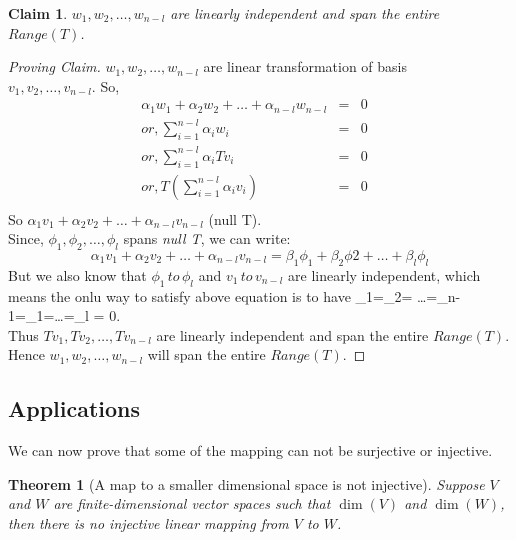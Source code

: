 \documentclass[a4paper,12pt,reqno,oneside]{amsart}
\newtheorem{theorem}{Theorem}
\theoremstyle{plain}
\newtheorem{claim}{Claim}
\numberwithin{equation}{section}
\begin{document}
	\begin{claim}
		$w_1, w_2, \ldots, w_{n-l}$ are linearly independent and span the entire $Range(T)$.
	\end{claim}
	\begin{proof}[Proving Claim]
	$w_1, w_2, \ldots, w_{n-l}$ are linear transformation of basis \\ $v_1, v_2, \ldots, v_{n-l}$.
	So,
	\begin{eqnarray*}
		\alpha_1  w_1 + \alpha_2 w_2 + \ldots + \alpha_{n-l} w_{n-l} & = & 0 & \\
		or, \sum_{i=1}^{n-l}{\alpha_i w_i} & = & 0 &\\
		or, \sum_{i=1}^{n-l}{\alpha_i Tv_i} & = & 0 &\\
		or, T(\sum_{i=1}^{n-l}{\alpha_i v_i}) & = & 0 &\\
	\end{eqnarray*} 
	So $ \alpha_1  v_1 + \alpha_2 v_2 + \ldots + \alpha_{n-l} v_{n-l} $ \in \dim(null T).\\
	Since, $\phi_1,\phi_2,\ldots,\phi_l$ spans \emph{null T}, we can write:
	$$
		\alpha_1  v_1 + \alpha_2 v_2 + \ldots + \alpha_{n-l} v_{n-l} = \beta_1 \phi_1 + \beta_2 \phi2 + \ldots + \beta_l \phi_l
	$$
	But we also know that $\phi_1 \, to \, \phi_l$ and $v_1 \, to \, v_{n-l}$ are linearly independent, which means the onlu way to satisfy above
	equation is to have \alpha_1=\alpha_2= \ldots=\alpha_{n-1}=\beta_1=\ldots=\beta_l = 0.\\
	Thus $Tv_1, Tv_2,\ldots, Tv_{n-l}$ are linearly independent and span the entire $Range(T)$.
	Hence $w_1, w_2, \ldots, w_{n-l}$ will span the entire $Range(T)$.
  \end{proof}

\subsection{Applications}

We can now prove that some of the mapping can not be surjective or injective.
\begin{theorem}[A map to a smaller dimensional space is not injective]
	Suppose $V$ and $W$ are finite-dimensional vector spaces such that $\dim(V)$ and
	\gtr $\dim(W)$, then there is no injective linear mapping from $V$ to $W$.
\end{theorem}
\end{document}
